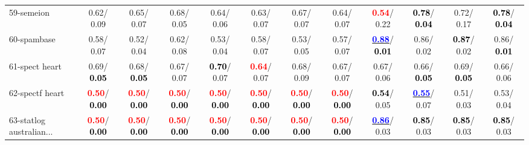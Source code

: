 \begin{table}[h]
\begin{center}
{\begin{tabular}{lc|c|c|c|c|c|c|c|c|c|c}
59-semeion &   0.62/  0.09 &   0.65/  0.07 &   0.68/  0.05 &   0.64/  0.06 &   0.63/  0.07 &   0.67/  0.07 &   0.64/  0.07 & \textcolor{red}{\textbf{  0.54}}/  0.22 & \textcolor{black}{\textbf{  0.78}}/\textcolor{black}{\textbf{  0.04}} &   0.72/  0.17 & \textcolor{black}{\textbf{  0.78}}/\textcolor{black}{\textbf{  0.04}} \\
60-spambase &   0.58/  0.07 &   0.52/  0.04 &   0.62/  0.08 &   0.53/  0.04 &   0.58/  0.07 &   0.53/  0.05 &   0.57/  0.07 & \underline{\textcolor{blue}{\textbf{  0.88}}}/\textcolor{black}{\textbf{  0.01}} &   0.86/  0.02 & \textcolor{black}{\textbf{  0.87}}/  0.02 &   0.86/\textcolor{black}{\textbf{  0.01}} \\ \hline
61-spect heart &   0.69/\textcolor{black}{\textbf{  0.05}} &   0.68/\textcolor{black}{\textbf{  0.05}} &   0.67/  0.07 & \textcolor{black}{\textbf{  0.70}}/  0.07 & \textcolor{red}{\textbf{  0.64}}/  0.07 &   0.68/  0.09 &   0.67/  0.07 &   0.67/  0.06 &   0.66/\textcolor{black}{\textbf{  0.05}} &   0.69/\textcolor{black}{\textbf{  0.05}} &   0.66/  0.06 \\
62-spectf heart & \textcolor{red}{\textbf{  0.50}}/\textcolor{black}{\textbf{  0.00}} & \textcolor{red}{\textbf{  0.50}}/\textcolor{black}{\textbf{  0.00}} & \textcolor{red}{\textbf{  0.50}}/\textcolor{black}{\textbf{  0.00}} & \textcolor{red}{\textbf{  0.50}}/\textcolor{black}{\textbf{  0.00}} & \textcolor{red}{\textbf{  0.50}}/\textcolor{black}{\textbf{  0.00}} & \textcolor{red}{\textbf{  0.50}}/\textcolor{black}{\textbf{  0.00}} & \textcolor{red}{\textbf{  0.50}}/\textcolor{black}{\textbf{  0.00}} & \textcolor{black}{\textbf{  0.54}}/  0.05 & \underline{\textcolor{blue}{\textbf{  0.55}}}/  0.07 &   0.51/  0.03 &   0.53/  0.04 \\
63-statlog australian... & \textcolor{red}{\textbf{  0.50}}/\textcolor{black}{\textbf{  0.00}} & \textcolor{red}{\textbf{  0.50}}/\textcolor{black}{\textbf{  0.00}} & \textcolor{red}{\textbf{  0.50}}/\textcolor{black}{\textbf{  0.00}} & \textcolor{red}{\textbf{  0.50}}/\textcolor{black}{\textbf{  0.00}} & \textcolor{red}{\textbf{  0.50}}/\textcolor{black}{\textbf{  0.00}} & \textcolor{red}{\textbf{  0.50}}/\textcolor{black}{\textbf{  0.00}} & \textcolor{red}{\textbf{  0.50}}/\textcolor{black}{\textbf{  0.00}} & \underline{\textcolor{blue}{\textbf{  0.86}}}/  0.03 & \textcolor{black}{\textbf{  0.85}}/  0.03 & \textcolor{black}{\textbf{  0.85}}/  0.03 & \textcolor{black}{\textbf{  0.85}}/  0.03 \\

\end{tabular}}
\end{center}
\end{table}
